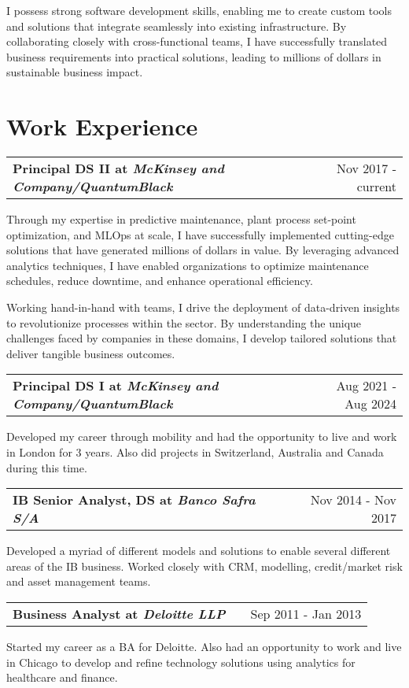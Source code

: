 \documentclass[a4paper,12pt]{article}
\makeatletter
\newenvironment{jobshort}[2]
    {
    \begin{tabularx}{\linewidth}{@{}l X r@{}}
    \textbf{#1} & \hfill &  #2 \\[3.75pt]
    \end{tabularx}
    }
    {
    }
\makeatother
\begin{document}
I possess strong software development skills, enabling me to create custom tools and solutions that integrate seamlessly into existing infrastructure. By collaborating closely with cross-functional teams, I have successfully translated business requirements into practical solutions, leading to millions of dollars in sustainable business impact.

\section{Work Experience}

\begin{jobshort}{Principal DS II at \textit{McKinsey and Company/QuantumBlack}}{Nov 2017 - current}
Through my expertise in predictive maintenance, plant process set-point optimization, and MLOps at scale,
I have successfully implemented cutting-edge solutions that have generated millions of dollars in value.
By leveraging advanced analytics techniques, I have enabled organizations to optimize maintenance schedules, reduce
downtime, and enhance operational efficiency.

Working hand-in-hand with teams, I drive the deployment of data-driven insights to revolutionize processes within the
sector. By understanding the unique challenges faced by companies in these domains, I develop tailored solutions that
deliver tangible business outcomes.
\end{jobshort}

\begin{jobshort}{Principal DS I at \textit{McKinsey and Company/QuantumBlack}}{Aug 2021 - Aug 2024}
Developed my career through mobility and had the opportunity to live and work in London for 3 years.
Also did projects in Switzerland, Australia and Canada during this time.
\end{jobshort}

\begin{jobshort}{IB Senior Analyst, DS at \textit{Banco Safra S/A}}{Nov 2014 - Nov 2017}
Developed a myriad of different models and solutions to enable several different areas of the
IB business. Worked closely with CRM, modelling, credit/market risk and asset management teams.
\end{jobshort}

\begin{jobshort}{Business Analyst at \textit{Deloitte LLP}}{Sep 2011 - Jan 2013}
Started my career as a BA for Deloitte. Also had an opportunity to work and live in Chicago to
develop and refine technology solutions using analytics for healthcare and finance.
\end{jobshort}
\end{document}
